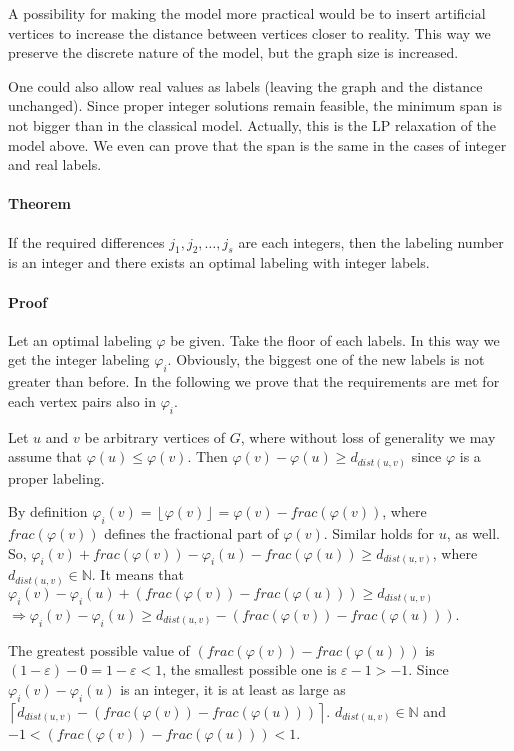 \documentclass[smallextended]{svjour3}
\begin{document}
A possibility for making the model more practical would be to 
insert artificial vertices to increase the distance between vertices 
closer to reality. This way we preserve the discrete nature of the model, 
but the graph size is increased. 

One could also allow real values as labels (leaving the graph and the distance 
unchanged). Since proper integer solutions remain feasible, 
the minimum span is not bigger than in the classical model. 
Actually, this is the LP relaxation of the model above. 
 We even can prove that the span is the same in the cases of integer and real labels. 


\paragraph{Theorem} 
If the required differences $j_1,j_2,\ldots ,j_{s}$ are each integers, then the labeling number is an integer and there exists an optimal labeling with integer labels. 

\paragraph{Proof} 
Let an optimal labeling $\varphi$ be given. Take the floor of each labels. In this way we get the integer labeling $\varphi_{i}$. Obviously, the biggest one of the new labels is not greater than before. In the following we prove that the requirements are met for each vertex pairs also in $\varphi_{i}$. 

Let $u$ and $v$ be arbitrary vertices of $G$, where without loss of generality we may assume that $\varphi(u)\leq\varphi(v)$. Then $\varphi(v)-\varphi(u)\geq d_{dist(u,v)}$ since $\varphi$ is a proper labeling. 

By definition $\varphi_{i}(v)=\left\lfloor \varphi(v)\right\rfloor =\varphi(v)-frac(\varphi(v))$, where $frac(\varphi(v))$ defines the fractional part of $\varphi(v)$. Similar holds for $u$, as well. So, $\varphi_{i}(v)+frac(\varphi(v))-\varphi_{i}(u)-frac(\varphi(u))\geq d_{dist(u,v)}$, 
where $d_{dist(u,v)}\in\mathbb{N}$. It means that $\varphi_{i}(v)-\varphi_{i}(u)+(frac(\varphi(v))-frac(\varphi(u)))\geq d_{dist(u,v)}$ 
$\Rightarrow\varphi_{i}(v)-\varphi_{i}(u)\geq d_{dist(u,v)}-(frac(\varphi(v))-frac(\varphi(u)))$. 


The greatest possible value of $(frac(\varphi(v))-frac(\varphi(u)))$ is $(1-\varepsilon)-0=1-\varepsilon<1$, the smallest possible one is $\varepsilon-1>-1$. Since $\varphi_{i}(v)-\varphi_{i}(u)$ is an integer, it is at least as large as $\left\lceil  d_{dist(u,v)}-(frac(\varphi(v))-frac(\varphi(u)))\right\rceil$. $d_{dist(u,v)}\in\mathbb{N}$ and $-1<(frac(\varphi(v))-frac(\varphi(u)))<1$. 
\end{document}
